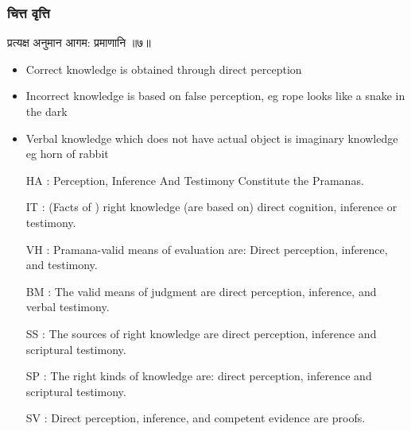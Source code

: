 \begin{frame}[fragile]\frametitle{चित्त वृत्ति}

\begin{sanskrit}
प्रत्यक्ष अनुमान आगम: प्रमाणानि ॥७॥
\end{sanskrit}


	\begin{itemize}
	\item Correct knowledge is obtained through direct perception
	\item Incorrect knowledge is based on false perception, eg rope looks like a snake in the dark
	\item Verbal knowledge which does not have actual object is imaginary knowledge eg horn of rabbit
	\item [HA]: Perception, Inference And Testimony Constitute the Pramanas.
	\item [IT]: (Facts of ) right knowledge (are based on) direct cognition, inference or testimony.
	\item [VH]: Pramana-valid means of evaluation are: Direct perception, inference, and testimony.
	\item [BM]: The valid means of judgment are direct perception, inference, and verbal testimony.
	\item [SS]: The sources of right knowledge are direct perception, inference and scriptural testimony.
	\item [SP]: The right kinds of knowledge are: direct perception, inference and scriptural testimony.
	\item [SV]: Direct perception, inference, and competent evidence are proofs.
	\end{itemize}

\end{frame}



